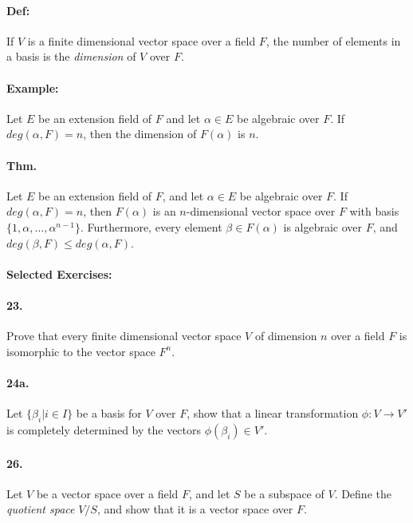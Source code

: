 \documentclass[10pt,a4paper]{article}
\begin{document}
\paragraph{Def:} If $V$ is a finite dimensional vector space over a field $F$, the number of elements in a basis is the \textit{dimension} of $V$ over $F$.

\paragraph{Example:} Let $E$ be an extension field of $F$ and let $\alpha \in E$ be algebraic over $F$. If $deg(\alpha, F) = n$, then the dimension of $F(\alpha)$ is $n$.

\paragraph{Thm.} Let $E$ be an extension field of $F$, and let $\alpha \in E$ be algebraic over $F$. If $deg(\alpha, F) =n$, then $F(\alpha)$ is an $n$-dimensional vector space over $F$ with basis $\{1, \alpha, \dots, \alpha^{n-1} \}$. Furthermore, every element $\beta \in F(\alpha)$ is algebraic over $F$, and $deg(\beta, F) \leq deg(\alpha, F)$. 

\paragraph{Selected Exercises:}

\paragraph{23.} Prove that every finite dimensional vector space $V$ of dimension $n$ over a field $F$ is isomorphic to the vector space $F^n$.

\paragraph{24a.} Let $\{ \beta_i | i \in I\}$ be a basis for $V$ over $F$, show that a linear transformation $\phi: V \to V'$ is completely determined by the vectors $\phi(\beta_i) \in V'$.

\paragraph{26.} Let $V$ be a vector space over a field $F$, and let $S$ be a subspace of $V$. Define the \textit{quotient space} $V/S$, and show that it is a vector space over $F$.
\end{document}
